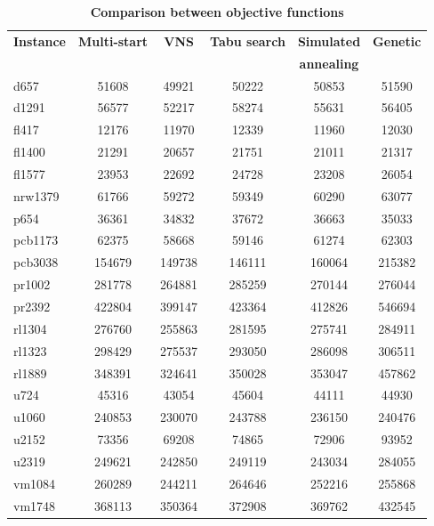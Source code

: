 \begin{table}[h!]
	\begin{center}
		\caption{\textbf{\large Comparison between objective functions}}
		\begin{tabular}{l|c|c|c|c|c}
			\textbf{Instance} & \textbf{Multi-start} & \textbf{    VNS    } & \textbf{Tabu search} & \textbf{Simulated} & \textbf{Genetic} \\
			& & & & \textbf{annealing} &\\
			\hline
			d657	 &	51608    & 49921	& 50222	& 50853	& 51590 \\
			d1291 &	56577    & 52217	& 58274	& 55631	& 56405 \\
			fl417 &	12176    & 11970	& 12339	& 11960	& 12030 \\
			fl1400 &	 21291   & 20657	& 21751	& 21011	& 21317 \\
			fl1577 & 23953   & 22692	& 24728	& 23208	& 26054 \\
			nrw1379 & 61766  & 59272	& 59349	& 60290	& 63077 \\
			p654    & 36361  & 34832	& 37672	& 36663	& 35033 \\
			pcb1173 & 62375  & 58668	& 59146	& 61274	& 62303 \\
			pcb3038 & 154679 & 149738 & 146111 & 160064 & 215382 \\
			pr1002	& 281778 & 264881 & 285259 & 270144 & 276044 \\
			pr2392	& 422804 & 399147 & 423364 & 412826 & 546694 \\
			rl1304	& 276760 & 255863 & 281595 & 275741 & 284911 \\
			rl1323	& 298429 & 275537 & 293050 & 286098 & 306511 \\
			rl1889	& 348391 & 324641 & 350028 & 353047 & 457862 \\
			u724		& 45316  & 43054  & 45604 & 44111 & 44930 \\
			u1060	& 240853 & 230070 & 243788 & 236150 & 240476 \\
			u2152  	& 73356	& 69208	& 74865 & 72906 & 93952 \\
			u2319 	& 249621	 & 242850 & 249119 & 243034 & 284055 \\
			vm1084 	& 260289	 & 244211 & 264646 & 252216 & 255868 \\
			vm1748	& 368113	 & 350364 & 372908 & 369762 & 432545 \\
		\end{tabular}
	\end{center}
\end{table}